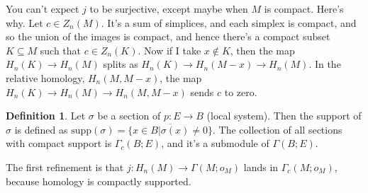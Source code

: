 \documentclass{amsart}
\theoremstyle{theorem}
\theoremstyle{definition}
\newtheorem{definition}[theorem]{Definition}
\begin{document}
You can't expect $j$ to be surjective, except maybe when $M$ is compact. Here's why. Let $c\in Z_n(M)$. It's a sum of simplices, and each simplex is compact, and so the union of the images is compact, and hence there's a compact subset $K\subseteq M$ such that $c\in Z_n(K)$. Now if I take $x\not\in K$, then the map $H_n(K)\to H_n(M)$ splits as $H_n(K)\to H_n(M-x)\to H_n(M)$. In the relative homology, $H_n(M,M-x)$, the map $H_n(K)\to H_n(M)\to H_n(M,M-x)$ sends $c$ to zero.
\begin{definition}
Let $\sigma$ be a section of $p:E\to B$ (local system). Then the support of $\sigma$ is defined as $\mathrm{supp}(\sigma)=\overline{\{x\in B|\sigma(x)\neq 0\}}$. The collection of all sections with compact support is $\Gamma_c(B;E)$, and it's a submodule of $\Gamma(B;E)$.
\end{definition}
The first refinement is that $j:H_n(M)\to \Gamma(M;o_M)$ lands in $\Gamma_c(M;o_M)$, because homology is compactly supported.
\end{document}
